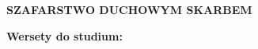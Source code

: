 \documentclass[10pt,a4paper,oneside]{article}
\begin{document}
\centerline{\textbf{\MakeUppercase{Szafarstwo duchowym skarbem}}}
\begin{center}
\textbf{Wersety do studium:} 

\end{center}
\end{document}
